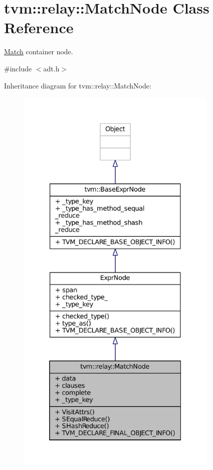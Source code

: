 \hypertarget{classtvm_1_1relay_1_1MatchNode}{}\section{tvm\+:\+:relay\+:\+:Match\+Node Class Reference}
\label{classtvm_1_1relay_1_1MatchNode}


\hyperlink{classtvm_1_1relay_1_1Match}{Match} container node.  




{\ttfamily \#include $<$adt.\+h$>$}



Inheritance diagram for tvm\+:\+:relay\+:\+:Match\+Node\+:
\nopagebreak
\begin{figure}[H]
\begin{center}
\leavevmode
\includegraphics[height=550pt]{classtvm_1_1relay_1_1MatchNode__inherit__graph}
\end{center}
\end{figure}


